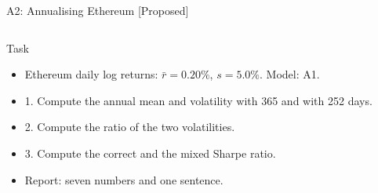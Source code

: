 \begin{frame}{A2: Annualising Ethereum [Proposed]}
\propsub
\itemsize{\scriptsize}
\begin{columns}[T]
\begin{column}{\taskw}
\begin{block}{Task}
\begin{itemize}
    \item Ethereum daily log returns: $\bar r = 0.20\%$, $s = 5.0\%$. Model: A1.
    \item 1. Compute the annual mean and volatility with 365 and with 252 days.
    \item 2. Compute the ratio of the two volatilities.
    \item 3. Compute the correct and the mixed Sharpe ratio.
    \item Report: seven numbers and one sentence.
\end{itemize}
\end{block}
\end{column}
\begin{column}{\solw}
\end{column}
\end{columns}
\end{frame}


